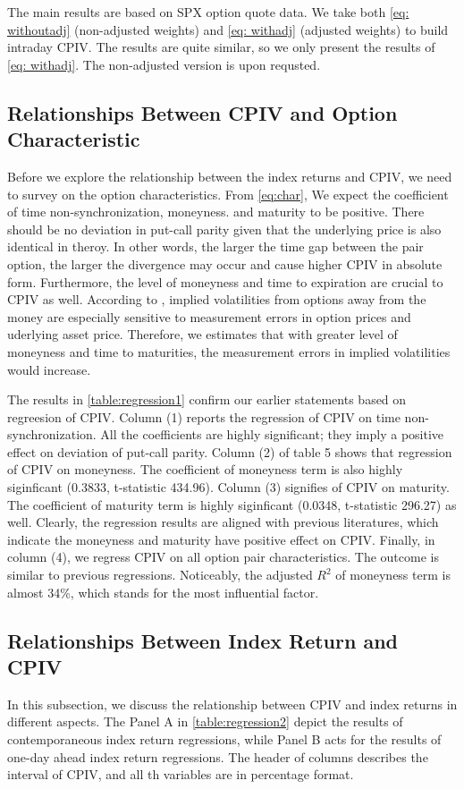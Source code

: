 
The main results are based on SPX option quote data. We take both \autoref{eq: withoutadj} (non-adjusted weights) and \autoref{eq: withadj} (adjusted weights) to build intraday CPIV. The results are quite similar, so we only present the results of \autoref{eq: withadj}. The non-adjusted version is upon requsted.

\subsection{Relationships Between CPIV and Option Characteristic}
Before we explore the relationship between the index returns and CPIV, we need to survey on the option characteristics. From \autoref{eq:char}, We expect the coefficient of time non-synchronization, moneyness. and maturity to be positive. There should be no deviation in put-call parity given that the underlying price is also identical in theroy. In other words, the larger the time gap between the pair option, the larger the divergence may occur and cause higher CPIV in absolute form. Furthermore, the level of moneyness and time to expiration are crucial to CPIV as well. According to \textcite{hentschel2003errors}, implied volatilities from options away from the money are especially sensitive to measurement errors in option prices and uderlying asset price. Therefore, we estimates that with greater level of moneyness and time to maturities, the measurement errors in implied volatilities would increase. 

The results in \autoref{table:regression1} confirm our earlier statements based on regreesion of CPIV. Column (1) reports the regression of CPIV on time non-synchronization. All the coefficients are highly significant; they imply a positive effect on deviation of put-call parity. Column (2) of table 5 shows that regression of CPIV on moneyness. The coefficient of moneyness term is also highly siginficant (0.3833, t-statistic 434.96). Column (3) signifies of CPIV on maturity. The coefficient of maturity term is highly siginficant (0.0348, t-statistic 296.27) as well. Clearly, the regression results are aligned with previous literatures, which indicate the moneyness and maturity have positive effect on CPIV. Finally, in column (4), we regress CPIV on all option pair characteristics. The outcome is similar to previous regressions. Noticeably, the adjusted $R^{2}$ of moneyness term is almost 34\%, which stands for the most influential factor. 

\subsection{Relationships Between Index Return and CPIV}
In this subsection, we discuss the relationship between CPIV and index returns in different aspects. The Panel A in \autoref{table:regression2} depict the results of contemporaneous index return regressions, while Panel B acts for the results of one-day ahead index return regressions. The header of columns describes the interval of CPIV, and all th variables are in percentage format. 

